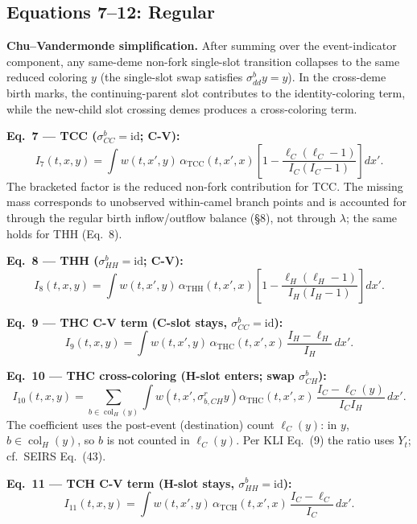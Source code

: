\documentclass[11pt]{article}
\newcommand{\col}{\operatorname{col}}
\theoremstyle{plain}
\begin{document}
\subsection{Equations 7--12: Regular}
\textbf{Chu--Vandermonde simplification.} After summing over the event-indicator component, any
same-deme non-fork single-slot transition collapses to the same reduced coloring $y$ (the
single-slot swap satisfies $\sigma^b_{dd}y=y$). In the cross-deme birth marks, the
continuing-parent slot contributes to the identity-coloring term, while the new-child slot crossing
demes produces a cross-coloring term.

\textbf{Eq.~7 --- TCC ($\sigma^b_{CC}=\mathrm{id}$; C-V):}
\begin{equation}
I_7(t,x,y)=\int w(t,x',y)\,\alpha_{\mathrm{TCC}}(t,x',x)\left[1-\frac{\ell_C(\ell_C-1)}{I_C(I_C-1)}\right]dx'.
\end{equation}
The bracketed factor is the reduced non-fork contribution for TCC. The missing mass corresponds to
unobserved within-camel branch points and is accounted for through the regular birth inflow/outflow
balance (\S8), not through $\lambda$; the same holds for THH (Eq.~8).

\textbf{Eq.~8 --- THH ($\sigma^b_{HH}=\mathrm{id}$; C-V):}
\begin{equation}
I_8(t,x,y)=\int w(t,x',y)\,\alpha_{\mathrm{THH}}(t,x',x)\left[1-\frac{\ell_H(\ell_H-1)}{I_H(I_H-1)}\right]dx'.
\end{equation}

\textbf{Eq.~9 --- THC C-V term (C-slot stays, $\sigma^b_{CC}=\mathrm{id}$):}
\begin{equation}
I_9(t,x,y)=\int w(t,x',y)\,\alpha_{\mathrm{THC}}(t,x',x)\,\frac{I_H-\ell_H}{I_H}\,dx'.
\end{equation}

\textbf{Eq.~10 --- THC cross-coloring (H-slot enters; swap $\sigma^b_{CH}$):}
\begin{equation}
I_{10}(t,x,y)=\sum_{b\in\col_H(y)}\int w\!\left(t,x',\sigma^r_{b,CH}y\right)\alpha_{\mathrm{THC}}(t,x',x)\,\frac{I_C-\ell_C(y)}{I_CI_H}\,dx'.
\end{equation}
The coefficient uses the post-event (destination) count $\ell_C(y)$: in $y$, $b\in\col_H(y)$, so
$b$ is not counted in $\ell_C(y)$. Per KLI Eq.~(9) the ratio uses $Y_t$; cf.\ SEIRS Eq.~(43).

\textbf{Eq.~11 --- TCH C-V term (H-slot stays, $\sigma^b_{HH}=\mathrm{id}$):}
\begin{equation}
I_{11}(t,x,y)=\int w(t,x',y)\,\alpha_{\mathrm{TCH}}(t,x',x)\,\frac{I_C-\ell_C}{I_C}\,dx'.
\end{equation}
\end{document}
